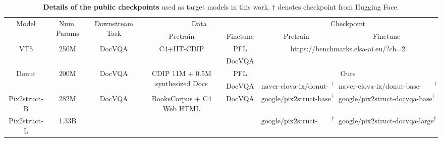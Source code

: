 \begin{table}[t]
\begin{center}
\begin{small}
\begin{adjustbox}{width=1\textwidth}
\small
\begin{tabular}{ccccccc}
\toprule
\multirow{2}{*}{Model} & \multirow{2}{*}{Num. Params} & \multirow{2}{*}{Downstream Task} & \multicolumn{2}{c}{Data} & \multicolumn{2}{c}{Checkpoint} \\
\cmidrule(l){4-5}
\cmidrule(l){6-7}
& & & Pretrain & Finetune & Pretrain & Finetune \\
\midrule 
\multirow{2}{*}{VT5} & \multirow{2}{*}{250M} & \multirow{2}{*}{DocVQA} & \multirow{2}{*}{C4+IIT-CDIP} & PFL & \multicolumn{2}{c}{\multirow{2}{*}{https://benchmarks.elsa-ai.eu/?ch=2}} \\
 &  &  &  & DocVQA &  & \\
\midrule 

\multirow{2}{*}{Donut} & \multirow{2}{*}{200M} & \multirow{2}{*}{DocVQA} & \multirow{2}{*}{CDIP 11M + 0.5M synthesized Docs} & PFL &  \multicolumn{2}{c}{Ours}  \\
 &  &  &  & DocVQA & $\text{naver-clova-ix/donut-base}^{\dagger}$ & $\text{naver-clova-ix/donut-base-finetuned-docvqa}^{\dagger}$  \\
\midrule 
Pix2struct-B & 282M & \multirow{2}{*}{DocVQA} & \multirow{2}{*}{BooksCorpus + C4 Web HTML} & \multirow{2}{*}{DocVQA} & $\text{google/pix2struct-base}^{\dagger}$ & $\text{google/pix2struct-docvqa-base}^{\dagger}$ \\
Pix2struct-L & 1.33B &  &  &  & $\text{google/pix2struct-large}^{\dagger}$ & $\text{google/pix2struct-docvqa-large}^{\dagger}$ \\
\bottomrule
\end{tabular}
\end{adjustbox}
\end{small}
\end{center}
\caption{\textbf{Details of the public checkpoints} used as target models in this work. $\dagger$ denotes checkpoint from Hugging Face.}
\label{tab:public_checkpoint}
\vskip -0.1in
\end{table}

